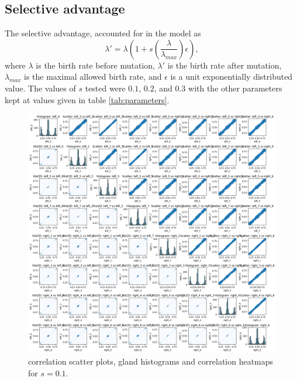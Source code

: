 \subsection{Selective advantage}
The selective advantage, accounted for in the model as
\begin{equation}
    \lambda' = \lambda\left(1 + s\left(\frac{\lambda}{\lambda_{max}}\right)\epsilon\right),
\end{equation}
where $\lambda$ is the birth rate before mutation, $\lambda'$ is the birth rate after mutation, $\lambda_{max}$ is the maximal allowed birth rate, and $\epsilon$ is a unit exponentially distributed value. The values of $s$ tested were $0.1$, $0.2$, and $0.3$ with the other parameters kept at values given in table \ref{tab:parameters}.
\begin{figure}[h]
    \centering
    \includegraphics[width=\textwidth]{Chapter_5/figures/sensitivity_selective_advantage1.png}
    \caption{correlation scatter plots, gland histograms and correlation heatmaps for $s=0.1$.}
    \label{fig:sensitivity_selective_advantage1}
\end{figure}
